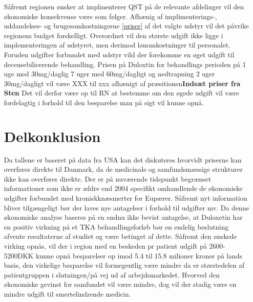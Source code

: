 Såfremt regionen ønsker at implmenterer QST på de relevante afdelinger vil den økonomiske konsekvense være som følger. Afhænig af implimenterings-, uddandelses- og brugesomkostningerne \ref{priser} af det valgte udstyr vil det påvrike regionens budget forskelligt. Overordnet vil den største udgift ikke ligge i implementeringen af udstyret, men derimod lønomkostninger til personalet. Foruden udgifter forbundet med udstyr vild der forekomme en øget udgift til decensebilicerende behandling. Prisen på  Duloxtin for behandlings perioden på 1 uge med 30mg/daglig 7 uger med 60mg/dagligt og nedtrapning 2 uger 30mg/dagligt vil være XXX til xxx afhænigt af præsitionen\textbf{Indsæt priser fra Sten} Det vil derfor være op til RN at bestemme om den øgede udgift vil være fordelagtig i forhold til den besparelse man på sigt vil kunne opnå.


\section{Delkonklusion}
Da tallene er baseret på data fra USA kan det diskuteres hvorvidt priserne kan overføres direkte til Danmark, da de medicinale og samfundsmæssige strukturer ikke kan overføres direkte. Der er på nuværende tidspunkt begrænset informationer som ikke er ældre end 2004 specifikt omhandlende de økonomiske udgifter forbundet med kroniskknæsmerter for Eupærer. Såfremt nyt information bliver tilgængeligt bør der laves nye antagelser i forhold til udgifter mv. 
Da denne økonomiske analyse baseres på en endnu ikke bevist antagelse, at Duloxetin har en positiv virkning på et TKA behandlingsforløb bør en endelig beslutning afvente resultaterne af studiet og være betinget af dette. Såfremt den ønskede virking opnås, vil der i region med en beskeden pr patient udgift på 2600-5200DKK kunne opnå besparelser op imod 5.4 til 15.8 milioner kroner på lands basis, den virkelige besparelse vil formegentlig være mindre da  er størstedelen af patientgruppen i slutningen/på vej ud af arbejdsmarkedet. Hvorved den økonomiske gevinst for samfundet vil være mindre, dog vil der stadig være en mindre udgift til smertelindrende medicin. 